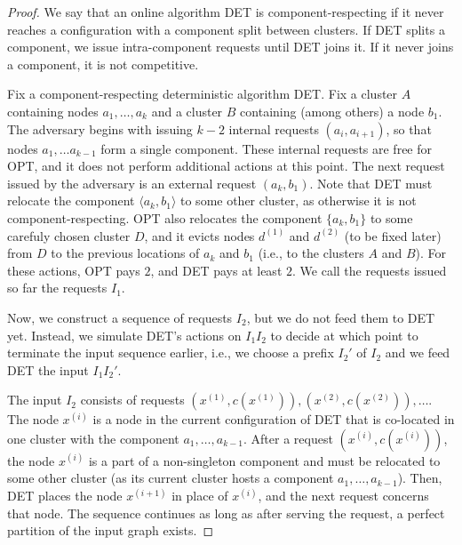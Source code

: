 \begin{proof}



 We say that an online algorithm DET is component-respecting if it never reaches a configuration with a component split between clusters.
 If DET splits a component, we issue intra-component requests until DET joins it.
 If it never joins a component, it is not competitive.
  
  Fix a component-respecting deterministic algorithm DET.
  Fix a cluster $A$ containing nodes $a_1, \ldots, a_k$ and a cluster $B$ containing (among others) a node $b_1$.
  The adversary begins with issuing $k-2$ internal requests $(a_i, a_{i+1})$, so that nodes $a_1, \ldots a_{k-1}$ form a single component.
  These internal requests are free for OPT, and it does not perform additional actions at this point.
  The next request issued by the adversary is an external request $(a_k, b_1)$. %
  Note that DET must relocate the component $\langle a_k, b_1\rangle$ to some other cluster, as otherwise it is not component-respecting.
  OPT also relocates the component $\{ a_k, b_1\}$ to some carefuly chosen cluster $D$, and it evicts nodes $d^{(1)}$ and $d^{(2)}$ (to be fixed later) from $D$ to the previous locations of $a_k$ and $b_1$ (i.e., to the clusters $A$ and $B$).
  For these actions, OPT pays $2$, and DET pays at least $2$.
  We call the requests issued so far the requests $I_1$.


  Now, we construct a sequence of requests $I_2$, but we do not feed them to DET yet.
  Instead, we simulate DET's actions on $I_1I_2$ to decide at which point to terminate the input sequence earlier, i.e., we choose a prefix $I_2'$ of $I_2$ and we feed DET the input $I_1I_2'$.


  The input $I_2$ consists of requests $(x^{(1)}, c(x^{(1)})), (x^{(2)}, c(x^{(2)})),\ldots$.
  The node $x^{(i)}$ is a node in the current configuration of DET that is co-located in one cluster with the component $a_1, \ldots, a_{k-1}$.
  After a request $(x^{(i)}, c(x^{(i)}))$, the node $x^{(i)}$ is a part of a non-singleton component and must be relocated to some other cluster (as its current cluster hosts a component $a_1, \ldots, a_{k-1}$).
  Then, DET places the node $x^{(i+1)}$ in place of $x^{(i)}$, and the next request concerns that node.
  The sequence continues as long as after serving the request, a perfect partition of the input graph exists.


\end{proof}
